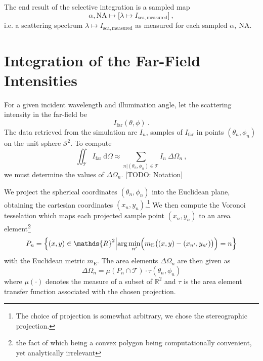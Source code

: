 \documentclass[10pt]{article}
\begin{document}
The end result of the selective integration is a sampled map 
$$
    \alpha,\mathrm{NA} \mapsto \bigl[ \lambda \mapsto I_\mathrm{sca,measured} \bigr] \ ,
$$
i.e. a scattering spectrum $\lambda \mapsto I_\mathrm{sca,measured}$ as measured for each sampled $\alpha,\ \mathrm{NA}$. 






\section*{Integration of the Far-Field Intensities}

For a given incident wavelength and illumination angle, let the scattering intensity in the far-field be
$$I_\mathrm{far}(\theta,\phi)\ .$$
The data retrieved from the simulation are $I_n$, samples of $I_\mathrm{far}$ in points $\left( \theta_n, \phi_n \right)$ on the unit sphere $\mathcal{S}^2$. 
To compute
$$
    \iint_{\mathcal{T}} I_\mathrm{far} \ \mathrm{d}\Omega \approx \sum_{n \vert \left( \theta_n, \phi_n \right)\in\mathcal{T}} I_n \ \Delta\Omega_n \ , 
$$
we must determine the values of $\Delta\Omega_n$. [TODO: Notation]

We project the spherical coordinates $\left( \theta_n, \phi_n \right)$ into the Euclidean plane, obtaining the cartesian coordinates $(x_n, y_n)$.\footnote{The choice of projection is somewhat arbitrary, we chose the stereographic projection.} 
We then compute the Voronoi tesselation which maps each projected sample point $(x_n, y_n)$ to an area element\footnote{the fact of which being a convex polygon being computationally convenient, yet analytically irrelevant} 
$$
P_n = \left\lbrace 
(x,y) \in \mathds{R}^2 
\middle\vert 
\mathrm{arg}\min\limits_{n'} \Bigl( m_\mathrm{E}\bigl( (x,y)-(x_{n'},y_{n'}) \bigr) \Bigr)
= n
\right\rbrace
$$ 
with the Euclidean metric $m_\mathrm{E}$. 
The area elements $\Delta\Omega_n$ are then given as 
$$
\Delta\Omega_n
=
\mu\left(
P_n \cap \mathcal{T}
\right) \cdot \tau\left( \theta_n, \phi_n \right)
$$
where $\mu(\cdot)$ denotes the measure of a subset of $\mathds{R}^2$ and $\tau$ is the area element transfer function associated with the chosen projection. 
\end{document}
